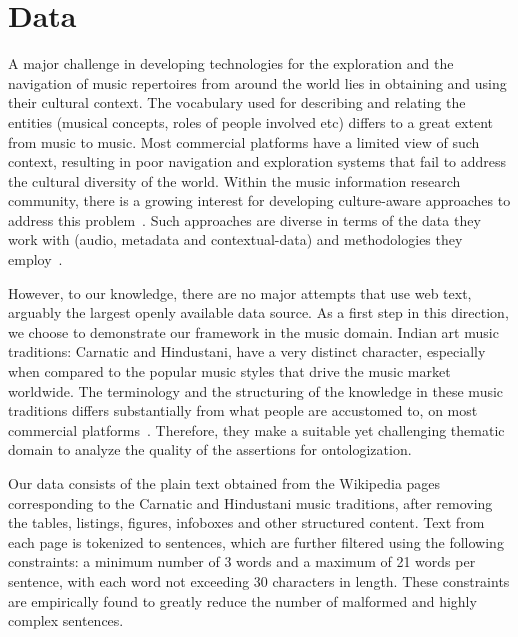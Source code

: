 \documentclass{llncs}
\begin{document}
\section{Data}
\label{sec:data}
A major challenge in developing technologies for the exploration and the navigation of music repertoires from around the world lies in obtaining and using their cultural context. The vocabulary used for describing and relating the entities (musical concepts, roles of people involved etc) differs to a great extent from music to music. Most commercial platforms have a limited view of such context, resulting in poor navigation and exploration systems that fail to address the cultural diversity of the world.  Within the music information research community, there is a growing interest for developing culture-aware approaches to address this problem~\cite{Serra2011}. Such approaches are diverse in terms of the data they work with (audio, metadata and contextual-data) and methodologies they employ~\cite{Serra2013a}. 

However, to our knowledge, there are no major attempts that use web text, arguably the largest openly available data source. As a first step in this direction, we choose to demonstrate our framework in the music domain. Indian art music traditions: Carnatic and Hindustani, have a very distinct character, especially when compared to the popular music styles that drive the music market worldwide. The terminology and the structuring of the knowledge in these music traditions differs substantially from what people are accustomed to, on most commercial platforms~\cite{Krishna2012}. Therefore, they make a suitable yet challenging thematic domain to analyze the quality of the assertions for ontologization. 

Our data consists of the plain text obtained from the Wikipedia pages corresponding to the Carnatic and Hindustani music traditions, after removing the tables, listings, figures, infoboxes and other structured content. Text from each page is tokenized to sentences, which are further filtered using the following constraints: a minimum number of 3 words and a maximum of 21 words per sentence, with each word not exceeding 30 characters in length. These constraints are empirically found to greatly reduce the number of malformed and highly complex sentences.
\end{document}
